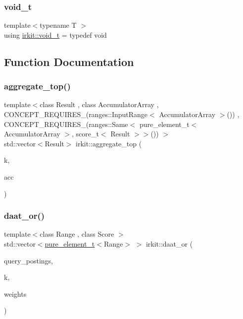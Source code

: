 \mbox{\label{namespaceirkit_ad3b30e41bd53e61f81bbd892123abe1a}} 
\subsubsection{\texorpdfstring{void\+\_\+t}{void\_t}}
{\footnotesize\ttfamily template$<$typename T $>$ \\
using \hyperlink{namespaceirkit_ad3b30e41bd53e61f81bbd892123abe1a}{irkit\+::void\+\_\+t} = typedef void}



\subsection{Function Documentation}
\mbox{\label{namespaceirkit_a396aecdabea315348fb31d095fd2efc8}} 
\subsubsection{\texorpdfstring{aggregate\+\_\+top()}{aggregate\_top()}}
{\footnotesize\ttfamily template$<$class Result , class Accumulator\+Array , C\+O\+N\+C\+E\+P\+T\+\_\+\+R\+E\+Q\+U\+I\+R\+E\+S\+\_\+(ranges\+::\+Input\+Range$<$ Accumulator\+Array $>$()) , C\+O\+N\+C\+E\+P\+T\+\_\+\+R\+E\+Q\+U\+I\+R\+E\+S\+\_\+(ranges\+::\+Same$<$ pure\+\_\+element\+\_\+t$<$ Accumulator\+Array $>$, score\+\_\+t$<$ Result $>$$>$()) $>$ \\
std\+::vector$<$Result$>$ irkit\+::aggregate\+\_\+top (\begin{DoxyParamCaption}\item[{std\+::size\+\_\+t}]{k,  }\item[{const Accumulator\+Array \&}]{acc }\end{DoxyParamCaption})}

\mbox{\label{namespaceirkit_ad6a1763616725ecb88e751ea7eb93453}} 
\subsubsection{\texorpdfstring{daat\+\_\+or()}{daat\_or()}}
{\footnotesize\ttfamily template$<$class Range , class Score $>$ \\
std\+::vector$<$\hyperlink{namespaceirkit_afcffab67300c5c703cb38a363c9a6f1d}{pure\+\_\+element\+\_\+t}$<$Range$>$ $>$ irkit\+::daat\+\_\+or (\begin{DoxyParamCaption}\item[{const std\+::vector$<$ Range $>$ \&}]{query\+\_\+postings,  }\item[{std\+::size\+\_\+t}]{k,  }\item[{const std\+::vector$<$ Score $>$ \&}]{weights }\end{DoxyParamCaption})}



